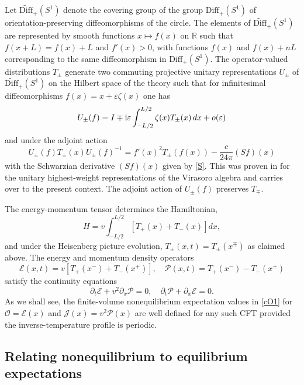\documentclass[12pt,a4paper]{article}
\newcommand{\SL}{S^1}
\newcommand{\Diff}{\mathrm{Diff}}
\newcommand{\wDiff}{\widetilde{\mathrm{Diff}}}
\newcommand{\ii}{{\rm i}}
\newcommand{\cE}{\mathcal{E}}
\newcommand{\cJ}{\mathcal{J}}
\newcommand{\cO}{\mathcal{O}}
\newcommand{\cP}{\mathcal{P}}
\theoremstyle{definition}
\theoremstyle{remark}
\begin{document}
Let $\wDiff_+(\SL)$ denote the covering group of the group
$\Diff_+(\SL)$ of orientation-preserving diffeomorphisms of
the circle. The elements
of $\wDiff_+(\SL)$ are represented by smooth functions
$x \mapsto f(x)$ on $\mathbb R$ such that $f(x+L)=f(x)+L$ and
$f'(x)>0$, with functions $f(x)$ and $f(x)+nL$ corresponding to
the same diffeomorphism in $\Diff_+(\SL)$. The operator-valued distributions
$T_{\pm}$ generate two commuting projective unitary representations
$U_{\pm}$ of $\wDiff_+(\SL)$ on the Hilbert space of the theory such
that for infinitesimal diffeomorphisms $f(x)=x+\varepsilon\zeta(x)$
one has
%
\begin{equation} 
U_{\pm}(f) = I \mp\ii \varepsilon \int_{-L/2}^{L/2}\zeta(x)T_{\pm}(x) \, dx + o(\varepsilon)
\end{equation}
%
and under the adjoint action
%
\begin{equation} 
\label{key1} 
U_{\pm}(f) T_{\pm}(x) U_{\pm}(f)^{-1} = f'(x)^2T_{\pm}(f(x)) - \frac{c}{24\pi}(Sf)(x)
\end{equation}
%
with the Schwarzian derivative $(Sf)(x)$ given by \eqref{S}.
This was proven in \cite{GW2} for the unitary highest-weight representations of the Virasoro algebra and carries over to the present context. 
The adjoint action of $U_{\pm}(f)$ preserves $T_{\mp}$.

The energy-momentum tensor determines the Hamiltonian,
%
\begin{equation} 
\label{Hdef1}
H = v\int_{-L/2}^{L/2} \left[ T_{+}(x) + T_{-}(x) \right] dx, 
\end{equation}
%
and under the Heisenberg picture evolution, $T_{\pm}(x,t) = T_{\pm}(x^\mp)$ as claimed above. The energy and momentum density operators 
%
\begin{equation}
\label{cEcP_Tpm}
\cE(x,t) = v \left[ T_{+}(x^-) + T_{-}(x^+) \right],
\quad
\cP(x,t) = T_{+}(x^-) - T_{-}(x^+)
\end{equation}
%
satisfy the continuity equations
%
\begin{equation}
\partial_t\cE + v^2\partial_x \cP = 0,
\quad \partial_t\cP+\partial_x\cE = 0.
\end{equation}
%
As we shall see, the finite-volume nonequilibrium expectation values in \eqref{cO1} for $\cO = \cE(x)$ and $\cJ(x) = v^2\cP(x)$ are well defined for any such CFT provided the inverse-temperature profile is periodic.  


\subsection{Relating  nonequilibrium to equilibrium expectations} 
\label{subsec:3.2} 
\end{document}
